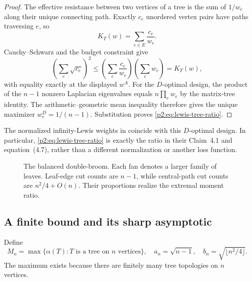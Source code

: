 \documentclass[11pt,a4paper]{article}
\theoremstyle{definition}
\theoremstyle{remark}
\numberwithin{equation}{section}
\begin{document}
\begin{proof}
The effective resistance between two vertices of a tree is the sum of
$1/w_e$ along their unique connecting path.  Exactly $c_e$ unordered
vertex pairs have paths traversing $e$, so
\[
 K_T(w)=\sum_{e\in E}\frac{c_e}{w_e}.
\]
Cauchy--Schwarz and the budget constraint give
\[
 \left(\sum_e\sqrt{c_e}\right)^2
 \leq \left(\sum_e\frac{c_e}{w_e}\right)\left(\sum_e w_e\right)
 =K_T(w),
\]
with equality exactly at the displayed $w^A$.
For the $D$-optimal design, the product of the $n-1$ nonzero Laplacian
eigenvalues equals $n\prod_e w_e$ by the matrix-tree identity.  The
arithmetic--geometric mean inequality therefore gives the unique
maximizer $w^D_e=1/(n-1)$.
Substitution proves \eqref{p2:eq:lewis-tree-ratio}.
\end{proof}

The normalized infinity-Lewis weights in
\cite{p2:SulimanWeinstein2023} coincide with this $D$-optimal design.
In particular, \eqref{p2:eq:lewis-tree-ratio} is exactly the ratio in their
Claim~4.1 and equation~(4.7), rather than a different normalization or
another loss function.

\begin{figure}[ht]
\centering
{}
\caption{The balanced double-broom. Each fan denotes a larger family of
leaves. Leaf-edge cut counts are $n-1$, while central-path cut counts are
$n^2/4+O(n)$. Their proportions realize the extremal moment ratio.}
\label{p2:fig:double-broom}
\end{figure}

\subsection{A finite bound and its sharp asymptotic}

Define
\[
 M_n=\max\{\alpha(T):T\text{ is a tree on }n\text{ vertices}\},
 \quad
 a_n=\sqrt{n-1},
 \quad
 b_n=\sqrt{\lfloor n^2/4\rfloor}.
\]
The maximum exists because there are finitely many tree topologies on
$n$ vertices.
\end{document}
